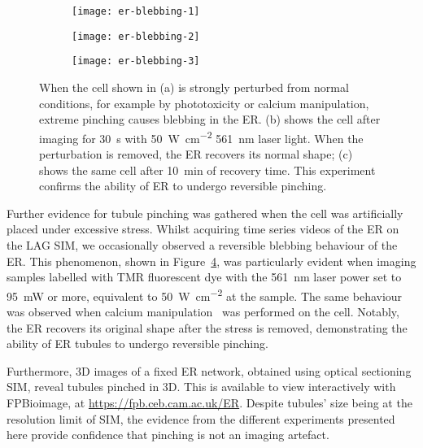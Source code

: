 \begin{figure}[b!]
\centering
\begin{subfigure}[b]{0.325\textwidth}
	\texttt{[image: er-blebbing-1]}
	\caption{}\label{fig:er-blebbing-1}
\end{subfigure}\hfill
\begin{subfigure}[b]{0.325\textwidth}
	\texttt{[image: er-blebbing-2]}
	\caption{}\label{fig:er-blebbing-2}
\end{subfigure}\hfill
\begin{subfigure}[b]{0.325\textwidth}
	\texttt{[image: er-blebbing-3]}
	\caption{}\label{fig:er-blebbing-3}
\end{subfigure}
\caption[ER: Phototoxicity confirms the ability of ER to undergo reversible pinching]{When the cell shown in (a) is strongly perturbed from normal conditions, for example by phototoxicity or calcium manipulation, extreme pinching causes blebbing in the ER. (b) shows the cell after imaging for \SI{30}{\second} with \SI{50}{\watt\per\cm\squared} \SI{561}{\nano\metre} laser light. When the perturbation is removed, the ER recovers its normal shape; (c) shows the same cell after \SI{10}{\minute} of recovery time. This experiment confirms the ability of ER to undergo reversible pinching. }
\label{fig:ER-blebbing}
\end{figure}

Further evidence for tubule pinching was gathered when the cell was artificially placed under excessive stress.
Whilst acquiring time series videos of the ER on the LAG SIM, we occasionally observed a reversible blebbing behaviour of the ER.
This phenomenon, shown in Figure~\ref{fig:ER-blebbing}, was particularly evident when imaging samples labelled with TMR fluorescent dye with the \SI{561}{\nano\meter} laser power set to \SI{95}{\milli\watt} or more, equivalent to \SI{50}{\watt\per\cm\squared} at the sample.
The same behaviour was observed when calcium manipulation~\cite{subramanian1997calcium} was performed on the cell.
Notably, the ER recovers its original shape after the stress is removed, demonstrating the ability of ER tubules to undergo reversible pinching.

Furthermore, 3D images of a fixed ER network, obtained using optical sectioning SIM, reveal tubules pinched in 3D.
This is available to view interactively with FPBioimage, at \url{https://fpb.ceb.cam.ac.uk/ER}.
Despite tubules' size being at the resolution limit of SIM, the evidence from the different experiments presented here provide confidence that pinching is not an imaging artefact.

